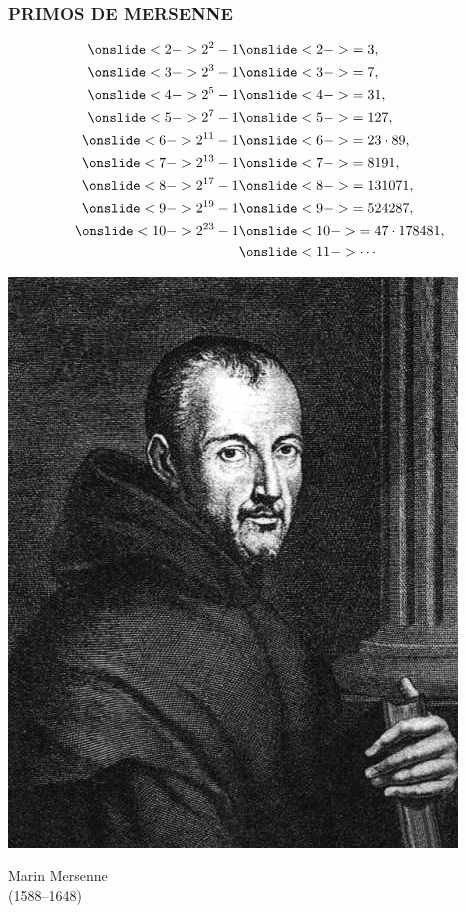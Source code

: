 \begin{frame}
  \frametitle{PRIMOS DE MERSENNE}

  \begin{minipage}[t][0.6\textheight]{0.6\textwidth}
    \vspace{-20pt}
    \begin{align*}
      \onslide<2->{2^2 - 1} & \onslide<2->{= 3,} \\
      \onslide<3->{2^3 - 1} & \onslide<3->{= 7,} \\
      \onslide<4->{2^5 - 1} & \onslide<4->{= 31,} \\
      \onslide<5->{2^7 - 1} & \onslide<5->{= 127,} \\
      \onslide<6->{2^{11} - 1} & \onslide<6->{= 23\cdot 89,} \\
      \onslide<7->{2^{13} - 1} & \onslide<7->{= 8191,} \\
      \onslide<8->{2^{17} - 1} & \onslide<8->{= 131071,} \\
      \onslide<9->{2^{19} - 1} & \onslide<9->{= 524287,} \\
      \onslide<10->{2^{23} - 1} & \onslide<10->{= 47\cdot 178481,} \\
      & \onslide<11->{\cdots}
    \end{align*}
  \end{minipage}
  \begin{minipage}[t]{0.35\textwidth}
    \vspace{0pt}\flushright
    \includegraphics[width=.9\textwidth]{pic/mersenne.jpg}

    Marin Mersenne\\
    (1588--1648)
  \end{minipage}
\end{frame}

